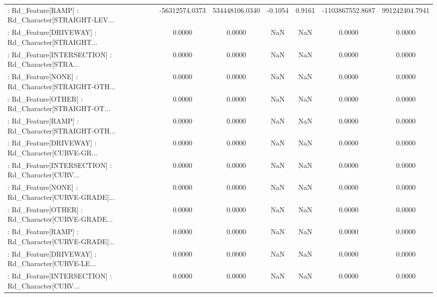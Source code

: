 \begin{longtable}{p{4cm}cccccc}
 : Rd\_Feature[RAMP] : Rd\_Character[STRAIGHT-LEV... &    -56312574.0373 &    534448106.0340 & -0.1054 &       0.9161 &   -1103867552.8687 &    991242404.7941 \\
 : Rd\_Feature[DRIVEWAY] : Rd\_Character[STRAIGHT... &            0.0000 &            0.0000 &     NaN &          NaN &             0.0000 &            0.0000 \\
 : Rd\_Feature[INTERSECTION] : Rd\_Character[STRA... &            0.0000 &            0.0000 &     NaN &          NaN &             0.0000 &            0.0000 \\
 : Rd\_Feature[NONE] : Rd\_Character[STRAIGHT-OTH... &            0.0000 &            0.0000 &     NaN &          NaN &             0.0000 &            0.0000 \\
 : Rd\_Feature[OTHER] : Rd\_Character[STRAIGHT-OT... &            0.0000 &            0.0000 &     NaN &          NaN &             0.0000 &            0.0000 \\
 : Rd\_Feature[RAMP] : Rd\_Character[STRAIGHT-OTH... &            0.0000 &            0.0000 &     NaN &          NaN &             0.0000 &            0.0000 \\
 : Rd\_Feature[DRIVEWAY] : Rd\_Character[CURVE-GR... &            0.0000 &            0.0000 &     NaN &          NaN &             0.0000 &            0.0000 \\
 : Rd\_Feature[INTERSECTION] : Rd\_Character[CURV... &            0.0000 &            0.0000 &     NaN &          NaN &             0.0000 &            0.0000 \\
 : Rd\_Feature[NONE] : Rd\_Character[CURVE-GRADE]... &            0.0000 &            0.0000 &     NaN &          NaN &             0.0000 &            0.0000 \\
 : Rd\_Feature[OTHER] : Rd\_Character[CURVE-GRADE... &            0.0000 &            0.0000 &     NaN &          NaN &             0.0000 &            0.0000 \\
 : Rd\_Feature[RAMP] : Rd\_Character[CURVE-GRADE]... &            0.0000 &            0.0000 &     NaN &          NaN &             0.0000 &            0.0000 \\
 : Rd\_Feature[DRIVEWAY] : Rd\_Character[CURVE-LE... &            0.0000 &            0.0000 &     NaN &          NaN &             0.0000 &            0.0000 \\
 : Rd\_Feature[INTERSECTION] : Rd\_Character[CURV... &            0.0000 &            0.0000 &     NaN &          NaN &             0.0000 &            0.0000 \\

\end{longtable}
